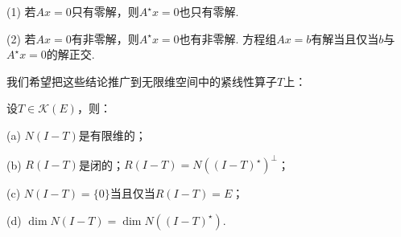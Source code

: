 (1) 若$Ax= 0$只有零解，则$A^\star x = 0$也只有零解.

(2) 若$Ax = 0$有非零解，则$A^\star x = 0$也有非零解.
方程组$Ax = b$有解当且仅当$b$与$A^\star x = 0$的解正交.

我们希望把这些结论推广到无限维空间中的紧线性算子$T$上：


\begin{theorem}[Fredholm择一定理]
    设$T \in \mathcal{K}(E)$，则：

    (a) $N(I-T)$是有限维的；

    (b) $R(I-T)$是闭的；$R(I-T) = N((I-T)^\star)^{\perp}$；

    (c) $N(I-T) = \{0\}$当且仅当$R(I-T) = E$；

    (d) $\dim N(I-T) = \dim N((I-T)^\star)$.
\end{theorem}

